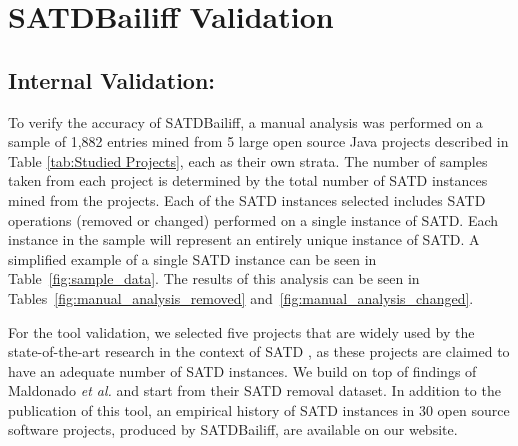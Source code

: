 \documentclass[3p]{elsarticle}
\newcommand{\approach}{SATDBailiff\xspace}
\begin{document}
\section{\approach Validation}
\label{section:validation}

 \subsection{Internal Validation:}
To verify the accuracy of \approach, a manual analysis was performed on a sample of 1,882 entries mined from 5 large open source Java projects described in Table \ref{tab:Studied Projects}, each as their own strata. The number of samples taken from each project is determined by the total number of SATD instances mined from the projects. Each of the SATD instances selected includes SATD operations (removed or changed) performed on a single instance of SATD. Each instance in the sample will represent an entirely unique instance of SATD. A simplified example of a single SATD instance can be seen in Table~\ref{fig:sample_data}. The results of this analysis can be seen in Tables~\ref{fig:manual_analysis_removed} and~\ref{fig:manual_analysis_changed}.


For the tool validation, we selected five projects that are widely used by the state-of-the-art research in the context of SATD \cite{Maldonado2017-2,Zampetti,iammarino2019self,zampetti2020automatically}, as these projects are claimed to have an adequate number of SATD instances. We build on top of findings of Maldonado \textit{et al.} \cite{Maldonado2017-2} and start from their SATD removal dataset. In addition to the publication of this tool, an empirical history of SATD instances in 30 open source software projects, produced by \approach, are available on our website.
\end{document}
